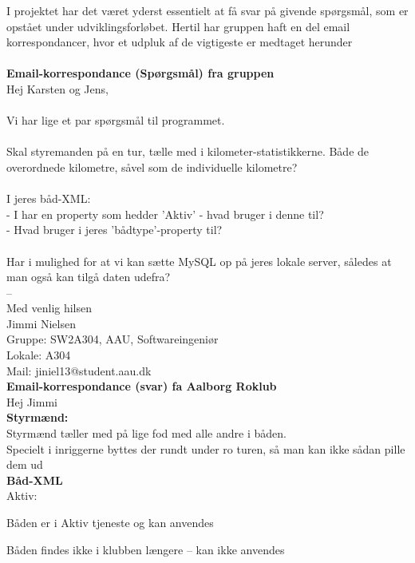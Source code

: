 \label{bil:email}
I projektet har det været yderst essentielt at få svar på givende spørgsmål, som er opstået under udviklingsforløbet.
Hertil har gruppen haft en del email korrespondancer, hvor et udpluk af de vigtigeste er medtaget herunder\\
\\
{\textbf{Email-korrespondance (Spørgsmål) fra gruppen}}\\
Hej Karsten og Jens,\\
\\
Vi har lige et par spørgsmål til programmet.\\
\\
Skal styremanden på en tur, tælle med i kilometer-statistikkerne. Både de overordnede kilometre, såvel som de individuelle kilometre?\\
\\
I jeres båd-XML: \\
- I har en property som hedder 'Aktiv' - hvad bruger i denne til?\\
- Hvad bruger i jeres 'bådtype'-property til?\\
\\
Har i mulighed for at vi kan sætte MySQL op på jeres lokale server, således at man også kan tilgå daten udefra?\\

-- \\
Med venlig hilsen\\
Jimmi Nielsen\\
Gruppe: SW2A304, AAU, Softwareingeniør\\
Lokale: A304 \\
Mail: jiniel13@student.aau.dk\\

{\textbf{Email-korrespondance (svar) fa Aalborg Roklub}}\\
Hej Jimmi\\

{\textbf{Styrmænd:}}\\
Styrmænd tæller med på lige fod med alle andre i båden.\\
Specielt i inriggerne byttes der rundt under ro turen, så man kan ikke sådan pille dem ud \\

{\textbf{Båd-XML}}\\
Aktiv:
\begin{enumerate_small}
    \item Båden er i Aktiv tjeneste og kan anvendes
    \item Båden findes ikke i klubben længere – kan ikke anvendes
\end{enumerate_small}

